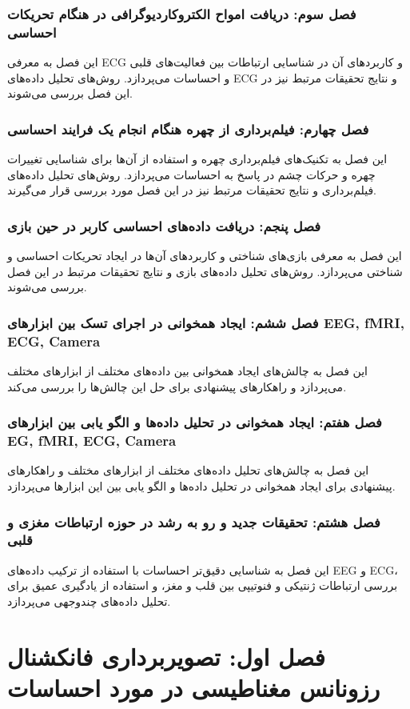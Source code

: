 \documentclass[12pt]{article}
\begin{document}
\subsubsection{فصل سوم: دریافت امواح الکتروکاردیوگرافی در هنگام تحریکات احساسی}
این فصل به معرفی ECG و کاربردهای آن در شناسایی ارتباطات بین فعالیت‌های قلبی و احساسات می‌پردازد. روش‌های تحلیل داده‌های ECG و نتایج تحقیقات مرتبط نیز در این فصل بررسی می‌شوند.
\subsubsection{فصل چهارم: فیلم‌برداری از چهره هنگام انجام یک فرایند احساسی}
این فصل به تکنیک‌های فیلم‌برداری چهره و استفاده از آن‌ها برای شناسایی تغییرات چهره و حرکات چشم در پاسخ به احساسات می‌پردازد. روش‌های تحلیل داده‌های فیلم‌برداری و نتایج تحقیقات مرتبط نیز در این فصل مورد بررسی قرار می‌گیرند.

\subsubsection{فصل پنجم: دریافت داده‌های احساسی کاربر در حین بازی}
این فصل به معرفی بازی‌های شناختی و کاربردهای آن‌ها در ایجاد تحریکات احساسی و شناختی می‌پردازد. روش‌های تحلیل داده‌های بازی و نتایج تحقیقات مرتبط در این فصل بررسی می‌شوند.
\subsubsection{فصل ششم: ایجاد همخوانی در اجرای تسک بین ابزارهای EEG, fMRI, ECG, Camera}
این فصل به چالش‌های ایجاد همخوانی بین داده‌های مختلف از ابزارهای مختلف می‌پردازد و راهکارهای پیشنهادی برای حل این چالش‌ها را بررسی می‌کند.
\subsubsection{فصل هفتم: ایجاد همخوانی در تحلیل داده‌ها و الگو یابی بین ابزارهای EG, fMRI, ECG, Camera}
این فصل به چالش‌های تحلیل داده‌های مختلف از ابزارهای مختلف و راهکارهای پیشنهادی برای ایجاد همخوانی در تحلیل داده‌ها و الگو یابی بین این ابزارها می‌پردازد.
\subsubsection{فصل هشتم: تحقیقات جدید و رو به رشد در حوزه ارتباطات مغزی و قلبی}
این فصل به شناسایی دقیق‌تر احساسات با استفاده از ترکیب داده‌های EEG و ECG، بررسی ارتباطات ژنتیکی و فنوتیپی بین قلب و مغز، و استفاده از یادگیری عمیق برای تحلیل داده‌های چندوجهی می‌پردازد.

\section{فصل اول: تصویربرداری فانکشنال رزونانس مغناطیسی در مورد احساسات}
\end{document}
